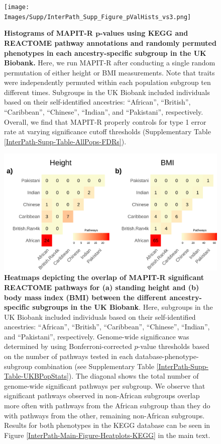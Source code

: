 \documentclass[10pt]{article}
\begin{document}
\begin{figure}[htbp]
\centering
\vspace*{-2cm}
\texttt{[image: Images/Supp/InterPath\_Supp\_Figure\_pValHists\_vs3.png]}
\caption{\textbf{Histograms of MAPIT-R $\bm{p}$-values using KEGG and REACTOME pathway annotations and randomly permuted phenotypes in each ancestry-specific subgroup in the UK Biobank.} Here, we run MAPIT-R after conducting a single random permutation of either height or BMI measurements. Note that traits were independently permuted within each population subgroup ten different times. Subgroups in the UK Biobank included individuals based on their self-identified ancestries: ``African'', ``British'', ``Caribbean'', ``Chinese'', ``Indian'', and ``Pakistani'', respectively. Overall, we find that MAPIT-R properly controls for type 1 error rate at varying significance cutoff thresholds (Supplementary Table \ref{InterPath-Supp-Table-AllPops-FDRs}).}
\label{InterPath-Supp-Figure-10perms-pValHists}
\end{figure}
\clearpage
\setlength{\footskip}{1cm}

\setlength{\footskip}{1cm}
\begin{figure}[htbp]
\centering
\includegraphics[width = \textwidth]{Images/Supp/InterPath_Supp_Figure_Heatplots_REACTOME_vs4.png}
\caption{\textbf{Heatmaps depicting the overlap of MAPIT-R significant REACTOME pathways for (a) standing height and (b) body mass index (BMI) between the different ancestry-specific subgroups in the UK Biobank}. Here, subgroups in the UK Biobank included individuals based on their self-identified ancestries: ``African'', ``British'', ``Caribbean'', ``Chinese'', ``Indian'', and ``Pakistani'', respectively. Genome-wide significance was determined by using Bonferroni-corrected $p$-value thresholds based on the number of pathways tested in each database-phenotype-subgroup combination (see Supplementary Table \ref{InterPath-Supp-Table-UKBPopStats}). The diagonal shows the total number of genome-wide significant pathways per subgroup. We observe that significant pathways observed in non-African subgroups overlap more often with pathways from the African subgroup than they do with pathways from the other, remaining non-African subgroups. Results for both phenotypes in the KEGG database can be seen in Figure \ref{InterPath-Main-Figure-Heatplots-KEGG} in the main text.}
\label{InterPath-Supp-Figure-Heatplots-REACTOME}
\end{figure}
\clearpage
\setlength{\footskip}{1cm}
\end{document}
